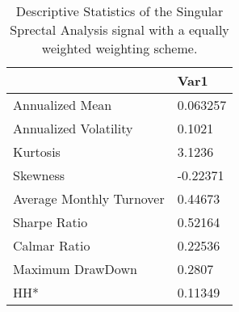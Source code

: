 \begin{table}[H]
\centering
\begin{tabular}{ll}
\hline& Var1 \\ 
\hline 
Annualized Mean & 0.063257 \\ 
Annualized Volatility & 0.1021 \\ 
Kurtosis & 3.1236 \\ 
Skewness & -0.22371 \\ 
Average Monthly Turnover & 0.44673 \\ 
Sharpe Ratio & 0.52164 \\ 
Calmar Ratio & 0.22536 \\ 
Maximum DrawDown & 0.2807 \\ 
HH* & 0.11349 \\ 
\hline
\end{tabular}
\caption{Descriptive Statistics of the Singular Sprectal Analysis signal with a equally weighted weighting scheme.}
\label{SSA_EW}
\end{table}
